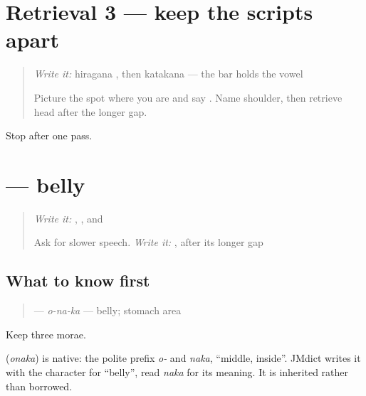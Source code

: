 \section[Practice]{Retrieval 3 — keep the scripts apart}

\label{lesson:JA-R12-mixed-scripts}



\begin{quote}
\emph{Write it:} hiragana \textbf{}, then katakana \textbf{} — the bar holds the vowel

Picture the spot where you are and say \textbf{}. Name shoulder, then retrieve head after the longer gap.
\end{quote}

\begin{tcolorbox}[breakable,colback=teal!4,colframe=teal!35!black,title={Before you move on}]
Stop after one pass.
\end{tcolorbox}
\section[\texorpdfstring{\ja{おなか} (onaka)}{おなか (onaka)}]{ — belly}

\label{lesson:JA-C12-onaka}



\begin{quote}
\emph{Write it:} \textbf{}, \textbf{}, and \textbf{}

Ask for slower speech. \emph{Write it:} \textbf{}, after its longer gap
\end{quote}

\subsection*{What to know first}
\begin{quote}
\textbf{} — \emph{o-na-ka} — belly; stomach area
\end{quote}

Keep three morae.

\begin{cousinweb}
\textbf{} (\emph{onaka}) is native: the polite prefix \emph{o-} and \emph{naka}, \textquotedblleft{}middle, inside\textquotedblright{}. JMdict writes it with the character for \textquotedblleft{}belly\textquotedblright{}, read \emph{naka} for its meaning. It is inherited rather than borrowed.
\end{cousinweb}

